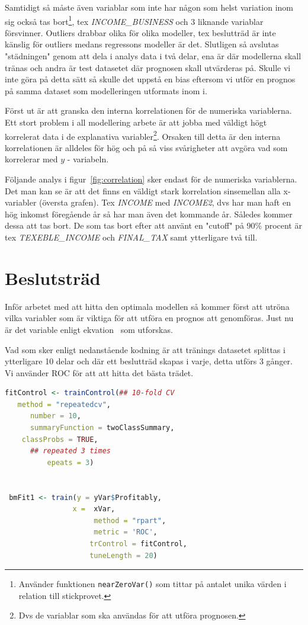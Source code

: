 \documentclass[swedish, english, 11pt ]{article}
\makeatletter
\newcommand{\code}[1]{\mbox{\texttt{#1}}}
\let\reftagform@=\tagform@
\def\tagform@#1{\maketag@@@{(\ignorespaces\textcolor{blue}{#1}\unskip\@@italiccorr)}}
\renewcommand{\eqref}[1]{\textup{\reftagform@{\ref{#1}}}}
\numberwithin{equation}{section}
\makeatother
\begin{document}
Samtidigt så måste även variablar som inte har någon som helst variation inom sig också tas bort\footnote{
	Använder funktionen \code{nearZeroVar()} som tittar på antalet unika värden i relation till stickprovet.

}, tex 
\textit{INCOME\_BUSINESS} och 3 liknande variablar försvinner. Outliers drabbar olika för olika 
modeller, tex beslutträd är inte känslig för outliers medans regressons modeller är det.
Slutligen så avslutas "städningen" genom att dela i analys data i två delar, ena är där modellerna 
skall tränas och andra är test datasetet där prognosen skall utvärderas på. Skulle vi inte göra på detta sätt
så skulle det uppstå en bias eftersom vi utför en prognos på samma dataset som modelleringen utformats inom i.

Först ut är att granska den interna korrelationen för de numeriska variablerna.
Ett stort problem i all modellering arbete är att jobba med väldigt högt korrelerat data i de explanativa variabler\footnote{
	Dvs de variablar som ska användas för att utföra prognosen. 
}.  Orsaken till detta är den interna korrelationen är alldeles för hög och på så viss svårigheter att avgöra vad som korrelerar med 
$y$ - variabeln. 

Följande analys i figur~\ref{fig:correlation} sker endast för de numeriska variablerna. 
Det man kan se är att det finns en väldigt stark korrelation sinsemellan alla x-variabler (översta grafen).
Tex \textit{INCOME} med \textit{INCOME2}, dvs har man haft en hög inkomst föregående år så har man 
även det kommande år.  Således kommer dessa att tas bort. De som tas bort efter att använt en "cutoff" på 
90\% procent är tex \textit{TEXEBLE\_INCOME} och  \textit{FINAL\_TAX} samt ytterligare två till.

 

\section{Beslutsträd}  

 Inför arbetet med att hitta den optimala modellen så kommer först att utröna vilka variabler som är 
 viktiga för att utföra en prognos att genomföras.  Just nu är det variable enligt ekvation~\eqref{eq:1}
 som utforskas.
 
Vad som sker enligt nedanstående kodning är att tränings datasetet  splittas i ytterligare 10 delar
och där ett beslutträd skapas i varje, detta utförs 3 gånger. Vi använder ROC för att att hitta 
det bästa trädet. 
\begin{lstlisting}[caption = \textsf{Metod}, language=R]
fitControl <- trainControl(## 10-fold CV
   method = "repeatedcv",
      number = 10,
      summaryFunction = twoClassSummary,
	classProbs = TRUE,
      ## repeated 3 times
          epeats = 3)


 bmFit1 <- train(y = yVar$Profitably,
				x =  xVar,
                	 method = "rpart", 
                	 metric = 'ROC',
                 	trControl = fitControl,
                 	tuneLength = 20)
\end{lstlisting} 
\end{document}
